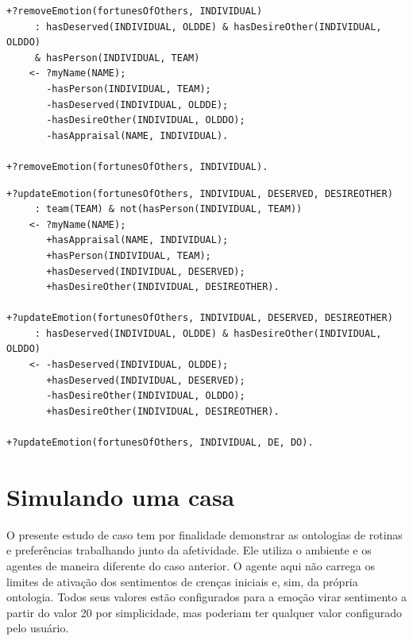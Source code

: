 \begin{center}
    \begin{minipage}{130mm}
	\lstset{linewidth=130mm}
	\begin{lstlisting}[frame=trbl,
caption=Amostra de remoção de emoção do tipo destino de outros.,
label=lst:removeSample]
+?removeEmotion(fortunesOfOthers, INDIVIDUAL)
     : hasDeserved(INDIVIDUAL, OLDDE) & hasDesireOther(INDIVIDUAL, OLDDO)
     & hasPerson(INDIVIDUAL, TEAM)
    <- ?myName(NAME);
       -hasPerson(INDIVIDUAL, TEAM);
       -hasDeserved(INDIVIDUAL, OLDDE);
       -hasDesireOther(INDIVIDUAL, OLDDO);
       -hasAppraisal(NAME, INDIVIDUAL).

+?removeEmotion(fortunesOfOthers, INDIVIDUAL).
	\end{lstlisting}
    \end{minipage}
\end{center}

\begin{center}
    \begin{minipage}{130mm}
	\lstset{linewidth=130mm}
	\begin{lstlisting}[frame=trbl,
caption=Amostra de código referente as atualizações de emoções do tipo destino
de outros.,
label=lst:update]
+?updateEmotion(fortunesOfOthers, INDIVIDUAL, DESERVED, DESIREOTHER)
     : team(TEAM) & not(hasPerson(INDIVIDUAL, TEAM))
    <- ?myName(NAME);
       +hasAppraisal(NAME, INDIVIDUAL);
       +hasPerson(INDIVIDUAL, TEAM);
       +hasDeserved(INDIVIDUAL, DESERVED);
       +hasDesireOther(INDIVIDUAL, DESIREOTHER).

+?updateEmotion(fortunesOfOthers, INDIVIDUAL, DESERVED, DESIREOTHER)
     : hasDeserved(INDIVIDUAL, OLDDE) & hasDesireOther(INDIVIDUAL, OLDDO)
    <- -hasDeserved(INDIVIDUAL, OLDDE);
       +hasDeserved(INDIVIDUAL, DESERVED);
       -hasDesireOther(INDIVIDUAL, OLDDO);
       +hasDesireOther(INDIVIDUAL, DESIREOTHER).

+?updateEmotion(fortunesOfOthers, INDIVIDUAL, DE, DO).
	\end{lstlisting}
    \end{minipage}
\end{center}

\section{Simulando uma casa} \label{ch:cdu:home}

O presente estudo de caso tem por finalidade demonstrar as ontologias de rotinas
e preferências trabalhando junto da afetividade. Ele utiliza o ambiente e os
agentes de maneira diferente do caso anterior. O agente aqui não carrega os
limites de ativação dos sentimentos de crenças iniciais e, sim, da própria
ontologia. Todos seus valores estão configurados para a emoção virar
sentimento a partir do valor 20\label{mark:emo} por simplicidade, mas poderiam ter qualquer
valor configurado pelo usuário.

